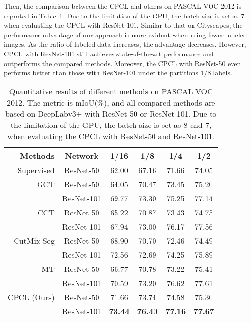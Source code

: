\documentclass[journal]{IEEEtran}
\begin{document}
Then, the comparison between the CPCL and others on PASCAL VOC 2012 is reported in Table~\ref{tab:voc_sota}. Due to the limitation of the GPU, the batch size is set as 7 when 
evaluating the CPCL with ResNet-101. Similar to that on Cityscapes, the performance advantage of our approach is more evident when using fewer labeled images. As the ratio of 
labeled data increases, the advantage decreases. However, CPCL with ResNet-101 still achieves state-of-the-art performance and outperforms the compared methods. Moreover, 
the CPCL with ResNet-50 even performs better than those with ResNet-101 under the partitions 1/8 labels.

\begin{table}[h]
  \footnotesize
  \caption{Quantitative results of different methods on PASCAL VOC 2012. The metric is mIoU(\%), and all compared methods are based on DeepLabv3+ with ResNet-50 or ResNet-101.
  Due to the limitation of the GPU, the batch size is set as 8 and 7, when evaluating the CPCL with ResNet-50 and ResNet-101.}
  \begin{center}
  \renewcommand{\arraystretch}{1.3}
  \begin{tabular}{rccccc} 
  \hline
    Methods                    & Network      & 1/16        & 1/8        & 1/4         & 1/2  \\ \hline
    Supervised                 & ResNet-50    & 62.00       & 67.16      & 71.66       & 74.05      \\
    GCT \cite{GCT}             & ResNet-50    & 64.05       & 70.47      & 73.45       & 75.20      \\
                               & ResNet-101   & 69.77       & 73.30      & 75.25       & 77.14      \\
    CCT \cite{CCT}             & ResNet-50    & 65.22       & 70.87      & 73.43       & 74.75      \\
                               & ResNet-101   & 67.94       & 73.00      & 76.17       & 77.56      \\
    CutMix-Seg \cite{2019Semi} & ResNet-50    & 68.90       & 70.70      & 72.46       & 74.49      \\
                               & ResNet-101   & 72.56       & 72.69      & 74.25       & 75.89      \\       
    MT \cite{MT}               & ResNet-50    & 66.77       & 70.78      & 73.22       & 75.41      \\ 
                               & ResNet-101   & 70.59       & 73.20      & 76.62       & 77.61      \\ \hline
    CPCL (Ours)                & ResNet-50    & 71.66       & 73.74      & 74.58       & 75.30      \\
                               & ResNet-101   & \bf 73.44   & \bf 76.40  & \bf 77.16   & \bf 77.67  \\ \hline           
   
  \end{tabular}
  \end{center}
  \label{tab:voc_sota}
\end{table}
\end{document}
